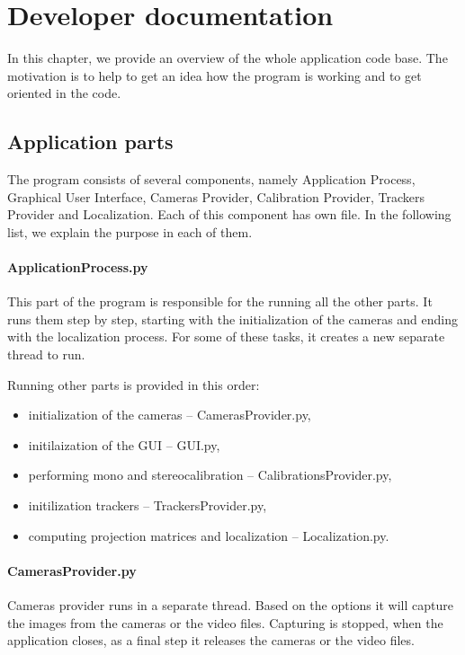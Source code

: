 \chapter{Developer documentation}

In this chapter, we provide an overview of the whole application code base. The
motivation is to help to get an idea how the program is working and to get
oriented in the code.

\section{Application parts}

The program consists of several components, namely Application Process,
Graphical User Interface, Cameras Provider, Calibration Provider, Trackers
Provider and Localization. Each of this component has own
file. In the following list, we explain the purpose in each of them.

\subsubsection*{ApplicationProcess.py}

This part of the program is responsible for the running all the other parts.
It runs them step by step, starting with the initialization of the cameras and
ending with the localization process. For some of these tasks, it creates a new
separate thread to run.

Running other parts is provided in this order: 
\begin{itemize} 
\item initialization of the cameras -- CamerasProvider.py, \item initilaization
of the GUI -- GUI.py, \item performing mono and stereocalibration --
CalibrationsProvider.py, \item initilization trackers -- TrackersProvider.py,
\item computing projection matrices and localization -- Localization.py.
\end{itemize}

\subsubsection*{CamerasProvider.py}

Cameras provider runs in a separate thread. Based on the options it will
capture the images from the cameras or the video files. Capturing is stopped,
when the application closes, as a final step it releases the cameras or the
video files.

